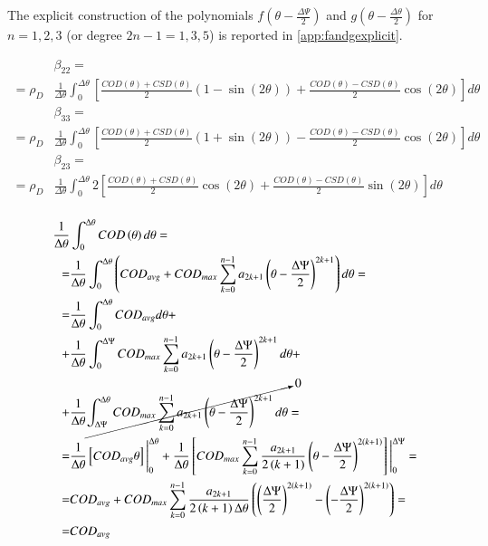 \documentclass[review]{elsarticle}
\begin{document}
The explicit construction of the polynomials $f\left(\theta-\frac{\Delta\Psi}{2}\right)$ and $g\left(\theta-\frac{\Delta\theta}{2}\right)$ for $n=1,2,3$ (or degree $2n-1=1,3,5$) is reported in \ref{app:fandgexplicit}.

\begin{equation}
\begin{aligned}
&\beta_{22}=\\
=\rho_{D}&\frac{1}{\Delta\theta}\int_{0}^{\Delta\theta}\left[\frac{COD\left(\theta\right)+CSD\left(\theta\right)}{2}\left(1-\sin\left(2\theta\right)\right)+\frac{COD\left(\theta\right)-CSD\left(\theta\right)}{2}\cos\left(2\theta\right)\right]d\theta\\
&\beta_{33}=\\
=\rho_{D}&\frac{1}{\Delta\theta}\int_{0}^{\Delta\theta}\left[\frac{COD\left(\theta\right)+CSD\left(\theta\right)}{2}\left(1+\sin\left(2\theta\right)\right)-\frac{COD\left(\theta\right)-CSD\left(\theta\right)}{2}\cos\left(2\theta\right)\right]d\theta\\
&\beta_{23}=\\
=\rho_{D}&\frac{1}{\Delta\theta}\int_{0}^{\Delta\theta}2\left[\frac{COD\left(\theta\right)+CSD\left(\theta\right)}{2}\cos\left(2\theta\right)+\frac{COD\left(\theta\right)-CSD\left(\theta\right)}{2}\sin\left(2\theta\right)\right]d\theta\\
\end{aligned}
\end{equation}

\begin{equation}
\begin{aligned}
\frac{1}{\Delta\theta}&\int_{0}^{\Delta\theta}COD\left(\theta\right)d\theta=\\
=&\frac{1}{\Delta\theta}\int_{0}^{\Delta\theta}\left(COD_{avg}+COD_{max}\sum_{k=0}^{n-1}a_{2k+1}\left(\theta-\frac{\Delta\Psi}{2}\right)^{2k+1}\right)d\theta=\\
=&\frac{1}{\Delta\theta}\int_{0}^{\Delta\theta}COD_{avg}d\theta+\\
+&\frac{1}{\Delta\theta}\int_{0}^{\Delta\Psi}COD_{max}\sum_{k=0}^{n-1}a_{2k+1}\left(\theta-\frac{\Delta\Psi}{2}\right)^{2k+1}d\theta+\\
+&\frac{1}{\Delta\theta}\cancelto{0}{\int_{\Delta\Psi}^{\Delta\theta}COD_{max}\sum_{k=0}^{n-1}a_{2k+1}\left(\theta-\frac{\Delta\Psi}{2}\right)^{2k+1}d\theta}=\\
=&\frac{1}{\Delta\theta}\left[COD_{avg}\theta\right]\Bigg\rvert_{0}^{\Delta\theta}+\frac{1}{\Delta\theta}\left[COD_{max}\sum_{k=0}^{n-1}\frac{a_{2k+1}}{2\left(k+1\right)}\left(\theta-\frac{\Delta\Psi}{2}\right)^{2\left(k+1\right)}\right]\Bigg\rvert_{0}^{\Delta\Psi}=\\
=&COD_{avg}+COD_{max}\sum_{k=0}^{n-1}\frac{a_{2k+1}}{2\left(k+1\right)\Delta\theta}\left(\left(\frac{\Delta\Psi}{2}\right)^{2\left(k+1\right)}-\left(-\frac{\Delta\Psi}{2}\right)^{2\left(k+1\right)}\right)=\\
=&COD_{avg}
\end{aligned}
\end{equation}
\end{document}
